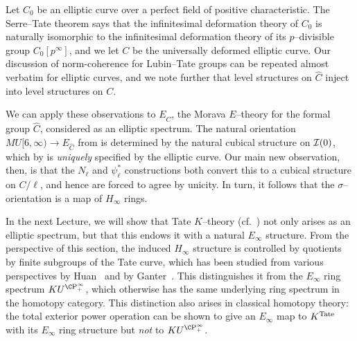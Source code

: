 \begin{example}
Let $C_0$ be an elliptic curve over a perfect field of positive characteristic.  The Serre--Tate theorem says that the infinitesimal deformation theory of $C_0$ is naturally isomorphic to the infinitesimal deformation theory of its $p$--divisible group $C_0[p^\infty]$, and we let $C$ be the universally deformed elliptic curve.  Our discussion of norm-coherence for Lubin--Tate groups can be repeated almost verbatim for elliptic curves, and we note further that level structures on $\widehat C$ inject into level structures on $C$.

We can apply these observations to $E_{\widehat C}$, the Morava $E$--theory for the formal group $\widehat C$, considered as an elliptic spectrum.  The natural orientation $MU[6, \infty) \to E_{\widehat C}$ from  is determined by the natural cubical structure on $\mathcal{I}(0)$, which by  is \emph{uniquely} specified by the elliptic curve.  Our main new observation, then, is that the $N_\ell$ and $\psi_\ell^*$ constructions both convert this to a cubical structure on $C / \ell$, and hence are forced to agree by unicity.  In turn, it follows that the $\sigma$--orientation is a map of $H_\infty$ rings.
\end{example}

\begin{remark}
In the next Lecture, we will show that Tate $K$--theory (cf.\ ) not only arises as an elliptic spectrum, but that this endows it with a natural $E_\infty$ structure.  From the perspective of this section, the induced $H_\infty$ structure is controlled by quotients by finite subgroups of the Tate curve, which has been studied from various perspectives by Huan~\cite{Huan} and by Ganter~\cite{GanterStringyOpns,GanterPowerOpnsInTateKthy}.  This distinguishes it from the $E_\infty$ ring spectrum $KU^{\CP^\infty_+}$, which otherwise has the same underlying ring spectrum in the homotopy category.  This distinction also arises in classical homotopy theory: the total exterior power operation can be shown to give an $E_\infty$ map to $K^{\mathrm{Tate}}$ with its $E_\infty$ ring structure but \emph{not} to $KU^{\CP^\infty_+}$.
\end{remark}
















